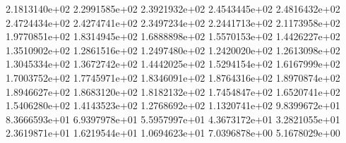 2.1813140e+02 
2.2991585e+02 
2.3921932e+02 
2.4543445e+02 
2.4816432e+02 
2.4724434e+02 
2.4274741e+02 
2.3497234e+02 
2.2441713e+02 
2.1173958e+02 
1.9770851e+02 
1.8314945e+02 
1.6888898e+02 
1.5570153e+02 
1.4426227e+02 
1.3510902e+02 
1.2861516e+02 
1.2497480e+02 
1.2420020e+02 
1.2613098e+02 
1.3045334e+02 
1.3672742e+02 
1.4442025e+02 
1.5294154e+02 
1.6167999e+02 
1.7003752e+02 
1.7745971e+02 
1.8346091e+02 
1.8764316e+02 
1.8970874e+02 
1.8946627e+02 
1.8683120e+02 
1.8182132e+02 
1.7454847e+02 
1.6520741e+02 
1.5406280e+02 
1.4143523e+02 
1.2768692e+02 
1.1320741e+02 
9.8399672e+01 
8.3666593e+01 
6.9397978e+01 
5.5957997e+01 
4.3673172e+01 
3.2821055e+01 
2.3619871e+01 
1.6219544e+01 
1.0694623e+01 
7.0396878e+00 
5.1678029e+00 

